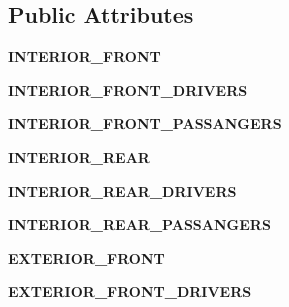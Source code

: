 \subsection*{Public Attributes}
\begin{DoxyCompactItemize}
\item 
\hypertarget{enumEnums_1_1Location_a8c0405987010de1eb87632d90df32d2e}{}{\bfseries I\+N\+T\+E\+R\+I\+O\+R\+\_\+\+F\+R\+O\+N\+T}\label{enumEnums_1_1Location_a8c0405987010de1eb87632d90df32d2e}

\item 
\hypertarget{enumEnums_1_1Location_a536dc9f7f5cc25643ebc8816dd97590d}{}{\bfseries I\+N\+T\+E\+R\+I\+O\+R\+\_\+\+F\+R\+O\+N\+T\+\_\+\+D\+R\+I\+V\+E\+R\+S}\label{enumEnums_1_1Location_a536dc9f7f5cc25643ebc8816dd97590d}

\item 
\hypertarget{enumEnums_1_1Location_a82a18ad57ca1f0390a45032424a5a56b}{}{\bfseries I\+N\+T\+E\+R\+I\+O\+R\+\_\+\+F\+R\+O\+N\+T\+\_\+\+P\+A\+S\+S\+A\+N\+G\+E\+R\+S}\label{enumEnums_1_1Location_a82a18ad57ca1f0390a45032424a5a56b}

\item 
\hypertarget{enumEnums_1_1Location_acb0bf8d82387e65e3c19399b7f462354}{}{\bfseries I\+N\+T\+E\+R\+I\+O\+R\+\_\+\+R\+E\+A\+R}\label{enumEnums_1_1Location_acb0bf8d82387e65e3c19399b7f462354}

\item 
\hypertarget{enumEnums_1_1Location_a47b02b13137149d67e2bf56f172f496d}{}{\bfseries I\+N\+T\+E\+R\+I\+O\+R\+\_\+\+R\+E\+A\+R\+\_\+\+D\+R\+I\+V\+E\+R\+S}\label{enumEnums_1_1Location_a47b02b13137149d67e2bf56f172f496d}

\item 
\hypertarget{enumEnums_1_1Location_a872c13ad2d0fdaf334c5f8939aee75d7}{}{\bfseries I\+N\+T\+E\+R\+I\+O\+R\+\_\+\+R\+E\+A\+R\+\_\+\+P\+A\+S\+S\+A\+N\+G\+E\+R\+S}\label{enumEnums_1_1Location_a872c13ad2d0fdaf334c5f8939aee75d7}

\item 
\hypertarget{enumEnums_1_1Location_ae90f4f56d1b9ce59314c732366077e69}{}{\bfseries E\+X\+T\+E\+R\+I\+O\+R\+\_\+\+F\+R\+O\+N\+T}\label{enumEnums_1_1Location_ae90f4f56d1b9ce59314c732366077e69}

\item 
\hypertarget{enumEnums_1_1Location_a3abc1237150077cf4e979a69ad00b223}{}{\bfseries E\+X\+T\+E\+R\+I\+O\+R\+\_\+\+F\+R\+O\+N\+T\+\_\+\+D\+R\+I\+V\+E\+R\+S}\label{enumEnums_1_1Location_a3abc1237150077cf4e979a69ad00b223}


\end{DoxyCompactItemize}
